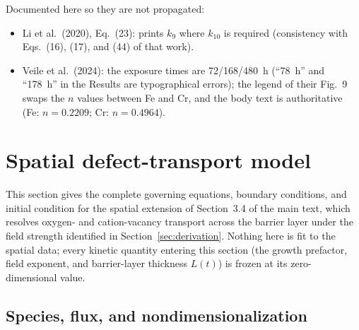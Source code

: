 Documented here so they are not propagated:
\begin{itemize}
\item Li et al.\ (2020), Eq.~(23): prints $k_9$ where $k_{10}$ is required
(consistency with Eqs.~(16), (17), and (44) of that work).
\item Veile et al.\ (2024): the exposure times are 72/168/480~h (``78~h'' and
``178~h'' in the Results are typographical errors); the legend of their Fig.~9
swaps the $n$ values between Fe and Cr, and the body text is authoritative
(Fe: $n = 0.2209$; Cr: $n = 0.4964$).
\end{itemize}

\section{Spatial defect-transport model}
\label{sec:spatial-derivation}

This section gives the complete governing equations, boundary conditions,
and initial condition for the spatial extension of Section~3.4 of the main
text, which resolves oxygen- and cation-vacancy transport across the
barrier layer under the field strength identified in
Section~\ref{sec:derivation}. Nothing here is fit to the spatial data;
every kinetic quantity entering this section (the growth prefactor, field
exponent, and barrier-layer thickness $L(t)$) is frozen at its
zero-dimensional value.

\subsection{Species, flux, and nondimensionalization}

